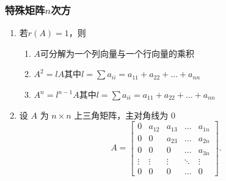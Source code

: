 \documentclass[a4paper,12pt]{article}
\begin{document}
    \subsubsection{特殊矩阵$n$次方}
    \begin{enumerate}
        \item 若$r(A) = 1$，则
        \begin{enumerate}
            \item $A$可分解为一个列向量与一个行向量的乘积
            \item $A^2 = lA$其中$l = \sum a_{ii} = a_{11} + a_{22} + \dots + a_{nn} $
            \item $A^n = l^{n-1}A$其中$l = \sum a_{ii} = a_{11} + a_{22} + \dots + a_{nn} $
        \end{enumerate}
        \item 设 $A$ 为 $n \times n$ 上三角矩阵，主对角线为 0
        \[
            A =
            \begin{bmatrix}
                0      & a_{12} & a_{13} & \dots  & a_{1n} \\
                0      & 0      & a_{23} & \dots  & a_{2n} \\
                0      & 0      & 0      & \dots  & a_{3n} \\
                \vdots & \vdots & \vdots & \ddots & \vdots \\
                0      & 0      & 0      & \dots  & 0
            \end{bmatrix}.
        \]


\end{enumerate}
\end{document}
